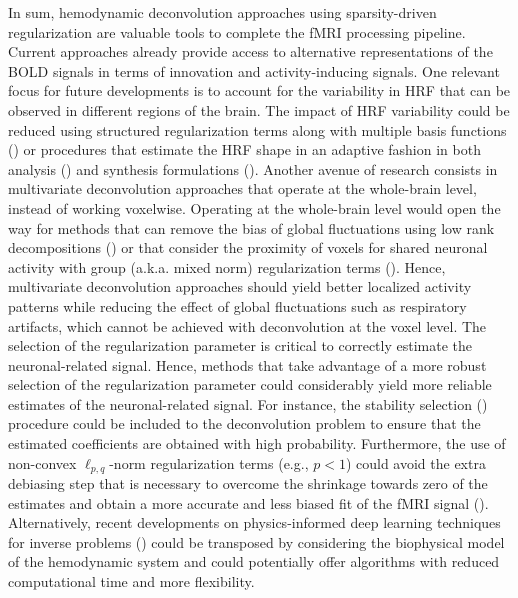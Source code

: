 In sum, hemodynamic deconvolution approaches using sparsity-driven regularization are valuable tools to complete the fMRI processing pipeline. Current approaches already provide access to alternative representations of the BOLD signals in terms of innovation and activity-inducing signals. One relevant focus for future developments is to account for the variability in HRF that can be observed in different regions of the brain. The impact of HRF variability could be reduced using structured regularization terms along with multiple basis functions (\citealt{Gaudes2012Structuredsparsedeconvolution}) or procedures that estimate the HRF shape in an adaptive fashion in both analysis (\citealt{Farouj2019BoldSignalDeconvolution}) and synthesis formulations (\citealt{cherkaoui:hal-03005584}). Another avenue of research consists in multivariate deconvolution approaches that operate at the whole-brain level, instead of working voxelwise.  Operating at the whole-brain level would open the way for methods that can remove the bias of global fluctuations using low rank decompositions (\citealt{cherkaoui:hal-03005584, Urunuela_2021}) or that consider the proximity of voxels for shared neuronal activity with group (a.k.a. mixed norm) regularization terms (\citealt{urunuela-tremino_2019}). Hence, multivariate deconvolution approaches should yield better localized activity patterns while reducing the effect of global fluctuations such as respiratory artifacts, which cannot be achieved with deconvolution at the voxel level. The selection of the regularization parameter is critical to correctly estimate the neuronal-related signal. Hence, methods that take advantage of a more robust selection of the regularization parameter could considerably yield more reliable estimates of the neuronal-related signal. For instance, the stability selection (\citealt{Meinshausen2010Stabilityselection,Urunuela2020StabilityBasedSparse}) procedure could be included to the deconvolution problem to ensure that the estimated coefficients are obtained with high probability. Furthermore, the use of non-convex \(\ell_{p,q}\)-norm regularization terms (e.g., \(p < 1\)) could avoid the extra debiasing step that is necessary to overcome the shrinkage towards zero of the estimates and obtain a more accurate and less biased fit of the fMRI signal (\citealt{Gaudes2013Paradigmfreemapping,CaballeroGaudes2019deconvolutionalgorithmmulti}). Alternatively, recent developments on physics-informed deep learning techniques for inverse problems (\citealt{Akcakaya2021,Monga2021,Ongie2020,Cherkaoui_2020}) could be transposed by considering the biophysical model of the hemodynamic system and could potentially offer algorithms with reduced computational time and more flexibility.